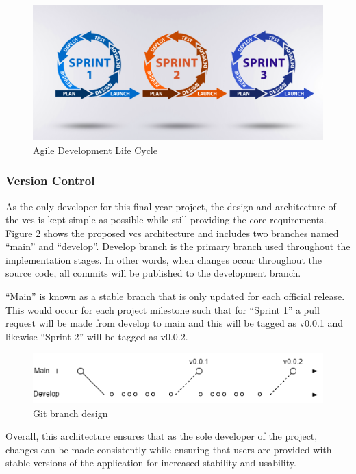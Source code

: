 \documentclass[11pt]{article}
\begin{document}
\begin{figure}[H]
  \centering
  \includegraphics[width=\textwidth]{images/development_life_cycle.png}
  \caption{Agile Development Life Cycle \cite{agile}}
  \label{fig:development_life_cycle}
\end{figure}

\subsubsection{Version Control}
As the only developer for this final-year project, the design and architecture
of the \gls*{vcs} is kept simple as possible while still providing the core
requirements. Figure \ref{fig:brancharch} shows the proposed \gls*{vcs}
architecture and includes two branches named ``main'' and ``develop''. Develop
branch is the primary branch used throughout the implementation stages. In other
words, when changes occur throughout the source code, all commits will be
published to the development branch.

``Main'' is known as a stable branch that is only updated for each official
release. This would occur for each project milestone such that for ``Sprint 1''
a pull request will be made from develop to main and this will be tagged as
v0.0.1 and likewise ``Sprint 2'' will be tagged as v0.0.2.

\begin{figure}[H]
  \centering
  \includegraphics[width=\textwidth]{images/current_branch_design.png}
  \caption{Git branch design}
  \label{fig:brancharch}
\end{figure}

Overall, this architecture ensures that as the sole developer of the project,
changes can be made consistently while ensuring that users are provided with
stable versions of the application for increased stability and usability.
\end{document}
